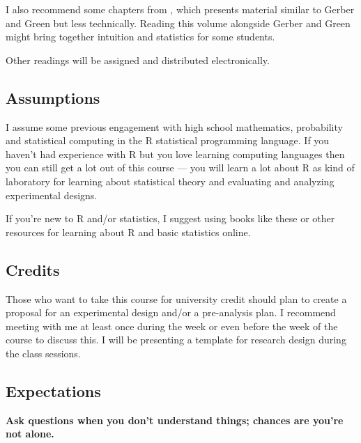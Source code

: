 \documentclass[10pt]{article}
\newenvironment{introstuff} {\setcounter{secnumdepth}{0}} {\setcounter{secnumdepth}{1}}
\begin{document}
\begin{introstuff}
I also recommend some chapters from
\href{https://www-jstor-org.eui.idm.oclc.org/stable/j.ctt4cgd52}{\cite{glennerster13}},
which presents material similar to Gerber and Green but less technically.
Reading this volume alongside Gerber and Green might bring together intuition
and statistics for some students.

Other readings will be assigned and distributed electronically.

\subsection{Assumptions}

        I assume some previous engagement with high school mathematics,
        probability and statistical computing in the R statistical programming
        language. If you haven't had experience with R but you love learning
        computing languages then you can still get a lot out of this course ---
        you will learn a lot about R as kind of laboratory for learning about
        statistical theory and evaluating and analyzing experimental designs.


If you're new to R and/or statistics, I suggest using books like these or other resources for learning about R and basic statistics online.

\begin{verse}

\end{verse}


\subsection{Credits}

Those who want to take this course for university credit should plan to create
a proposal for an experimental design and/or a pre-analysis plan. I recommend
meeting with me at least once during the week or even before the week of the
course to discuss this.  I will be presenting a template for research design
during the class sessions.

\subsection{Expectations}

\textbf{Ask questions when you don't understand things; chances are you're not
alone.}

 \end{introstuff}
\end{document}
